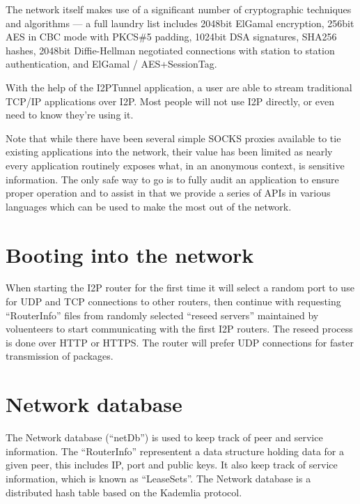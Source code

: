 \documentclass[a4paper,twocolumn,12pt]{article}
\begin{document}
The network itself makes use of a significant number of cryptographic techniques and
algorithms --- a full laundry list includes 2048bit ElGamal\cite{DBLP:journals/tit/Elgamal85}
encryption, 256bit AES\cite{books/sp/DaemenR02} in CBC mode with PKCS\#5 padding, 1024bit 
DSA\cite{2000--dss} signatures, SHA256 hashes, 2048bit Diffie-Hellman negotiated connections with 
station to station authentication, and ElGamal / AES+SessionTag.

\vspace{2 em}

With the help of the I2PTunnel application, a user are able to stream
traditional TCP/IP\cite{rfc793} applications over I2P. Most people will not use I2P
directly, or even need to know they're using it.

Note that while there have been several simple SOCKS proxies available to tie
existing applications into the network, their value has been limited as nearly
every application routinely exposes what, in an anonymous context, is sensitive
information. The only safe way to go is to fully audit an application to ensure
proper operation and to assist in that we provide a series of APIs in various
languages which can be used to make the most out of the network.

\section{Booting into the network}

When starting the I2P router for the first time it will select a random port to use for UDP
and TCP connections to other routers, then continue with requesting ``RouterInfo'' files
from randomly selected ``reseed servers'' maintained by voluenteers to start communicating
with the first I2P routers. The reseed process is done over HTTP or HTTPS. The router will prefer
UDP connections for faster transmission of packages.

\section{Network database}

The Network database (``netDb'') is used to keep track of peer and service
information. The ``RouterInfo'' representent a data structure holding data for a
given peer, this includes IP, port and public keys. It also keep track of
service information, which is known as ``LeaseSets''. The Network database is a
distributed hash table based on the Kademlia\cite{Maymounkov:2002:KPI:646334.687801} protocol.
\end{document}
